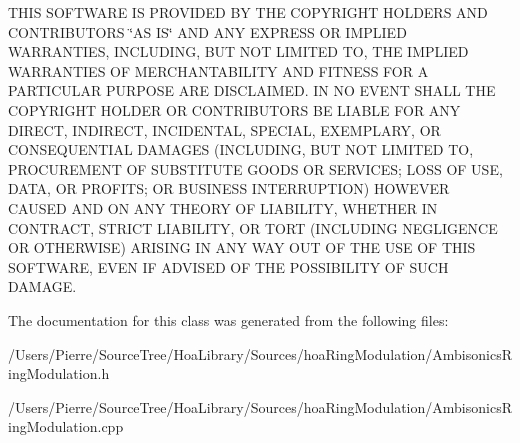 T\-H\-I\-S S\-O\-F\-T\-W\-A\-R\-E I\-S P\-R\-O\-V\-I\-D\-E\-D B\-Y T\-H\-E C\-O\-P\-Y\-R\-I\-G\-H\-T H\-O\-L\-D\-E\-R\-S A\-N\-D C\-O\-N\-T\-R\-I\-B\-U\-T\-O\-R\-S \char`\"{}\-A\-S I\-S\char`\"{} A\-N\-D A\-N\-Y E\-X\-P\-R\-E\-S\-S O\-R I\-M\-P\-L\-I\-E\-D W\-A\-R\-R\-A\-N\-T\-I\-E\-S, I\-N\-C\-L\-U\-D\-I\-N\-G, B\-U\-T N\-O\-T L\-I\-M\-I\-T\-E\-D T\-O, T\-H\-E I\-M\-P\-L\-I\-E\-D W\-A\-R\-R\-A\-N\-T\-I\-E\-S O\-F M\-E\-R\-C\-H\-A\-N\-T\-A\-B\-I\-L\-I\-T\-Y A\-N\-D F\-I\-T\-N\-E\-S\-S F\-O\-R A P\-A\-R\-T\-I\-C\-U\-L\-A\-R P\-U\-R\-P\-O\-S\-E A\-R\-E D\-I\-S\-C\-L\-A\-I\-M\-E\-D. I\-N N\-O E\-V\-E\-N\-T S\-H\-A\-L\-L T\-H\-E C\-O\-P\-Y\-R\-I\-G\-H\-T H\-O\-L\-D\-E\-R O\-R C\-O\-N\-T\-R\-I\-B\-U\-T\-O\-R\-S B\-E L\-I\-A\-B\-L\-E F\-O\-R A\-N\-Y D\-I\-R\-E\-C\-T, I\-N\-D\-I\-R\-E\-C\-T, I\-N\-C\-I\-D\-E\-N\-T\-A\-L, S\-P\-E\-C\-I\-A\-L, E\-X\-E\-M\-P\-L\-A\-R\-Y, O\-R C\-O\-N\-S\-E\-Q\-U\-E\-N\-T\-I\-A\-L D\-A\-M\-A\-G\-E\-S (I\-N\-C\-L\-U\-D\-I\-N\-G, B\-U\-T N\-O\-T L\-I\-M\-I\-T\-E\-D T\-O, P\-R\-O\-C\-U\-R\-E\-M\-E\-N\-T O\-F S\-U\-B\-S\-T\-I\-T\-U\-T\-E G\-O\-O\-D\-S O\-R S\-E\-R\-V\-I\-C\-E\-S; L\-O\-S\-S O\-F U\-S\-E, D\-A\-T\-A, O\-R P\-R\-O\-F\-I\-T\-S; O\-R B\-U\-S\-I\-N\-E\-S\-S I\-N\-T\-E\-R\-R\-U\-P\-T\-I\-O\-N) H\-O\-W\-E\-V\-E\-R C\-A\-U\-S\-E\-D A\-N\-D O\-N A\-N\-Y T\-H\-E\-O\-R\-Y O\-F L\-I\-A\-B\-I\-L\-I\-T\-Y, W\-H\-E\-T\-H\-E\-R I\-N C\-O\-N\-T\-R\-A\-C\-T, S\-T\-R\-I\-C\-T L\-I\-A\-B\-I\-L\-I\-T\-Y, O\-R T\-O\-R\-T (I\-N\-C\-L\-U\-D\-I\-N\-G N\-E\-G\-L\-I\-G\-E\-N\-C\-E O\-R O\-T\-H\-E\-R\-W\-I\-S\-E) A\-R\-I\-S\-I\-N\-G I\-N A\-N\-Y W\-A\-Y O\-U\-T O\-F T\-H\-E U\-S\-E O\-F T\-H\-I\-S S\-O\-F\-T\-W\-A\-R\-E, E\-V\-E\-N I\-F A\-D\-V\-I\-S\-E\-D O\-F T\-H\-E P\-O\-S\-S\-I\-B\-I\-L\-I\-T\-Y O\-F S\-U\-C\-H D\-A\-M\-A\-G\-E. 

The documentation for this class was generated from the following files\-:\begin{DoxyCompactItemize}
\item 
/\-Users/\-Pierre/\-Source\-Tree/\-Hoa\-Library/\-Sources/hoa\-Ring\-Modulation/Ambisonics\-Ring\-Modulation.\-h\item 
/\-Users/\-Pierre/\-Source\-Tree/\-Hoa\-Library/\-Sources/hoa\-Ring\-Modulation/Ambisonics\-Ring\-Modulation.\-cpp\end{DoxyCompactItemize}

